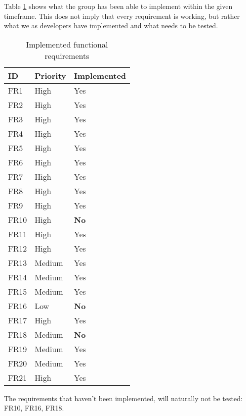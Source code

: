 Table \ref{tab:implemented_reqs} shows what the group has been able to implement within the given timeframe. This does not imply that every requirement is working, but rather what we as developers have implemented and what needs to be tested. 

\begin{table}[H]
	\begin{center}
	\begin{tabular}{p{2cm} | p{2cm} | p{4cm}}
    	\hline
		\textbf{ID} 			& 	\textbf{Priority}	&	\textbf{Implemented}\\ 
		\hline
		FR1			&	High				&	Yes						\\
		FR2			& 	High				& 	Yes						\\
		FR3			& 	High 				& 	Yes						\\
		FR4			&	High				& 	Yes 					\\
		FR5			& 	High				& 	Yes						\\
		FR6			& 	High				& 	Yes						\\
		FR7			& 	High				& 	Yes						\\
		FR8			&	High				&	Yes						\\
		FR9			&	High				& 	Yes						\\
		FR10		&	High				& 	\textbf{No} 			\\
		FR11		&	High				&	Yes\*					\\
		FR12		&	High				&	Yes						\\
		FR13		&	Medium				&	Yes						\\
		FR14		&	Medium				& 	Yes						\\
		FR15		&	Medium				& 	Yes						\\
		FR16		&	Low					&	\textbf{No}				\\
		FR17		&	High				&	Yes						\\
		FR18		&	Medium				& 	\textbf{No}				\\
		FR19		&	Medium				&	Yes						\\
		FR20		&	Medium				&	Yes						\\
		FR21		&	High				&	Yes						\\
		\hline
    \end{tabular}
\end{center}
	\caption{Implemented functional requirements}
	\label{tab:implemented_reqs}
\end{table}

The requirements that haven't been implemented, will naturally not be tested: FR10, FR16, FR18. 

